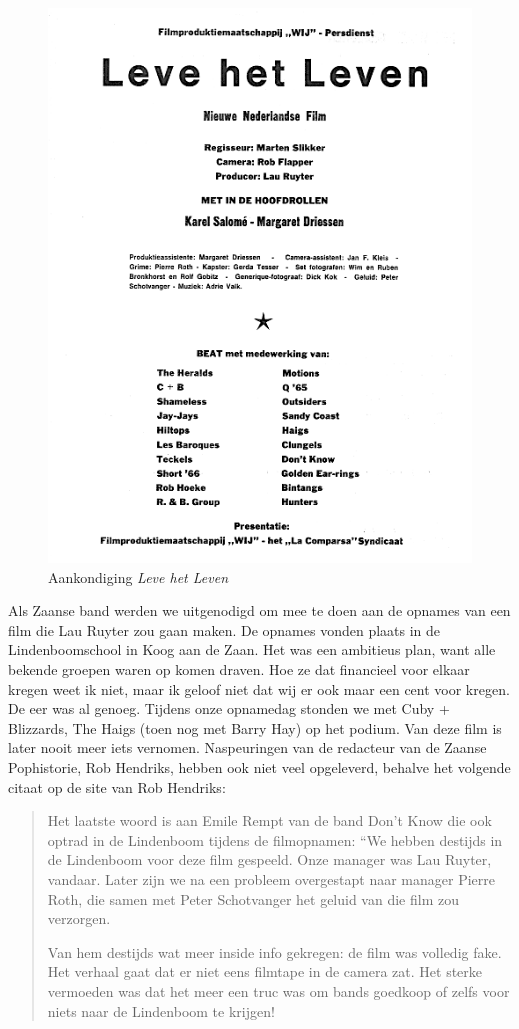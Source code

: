 \documentclass[10pt,twoside, openright]{memoir}
\begin{document}
\begin{figure}
\includegraphics[width=\textwidth]{img/ch30/film}
\caption*{\footnotesize Aankondiging \emph{Leve het Leven}}
\end{figure}

Als Zaanse band werden we uitgenodigd om mee te doen aan de opnames van een film die Lau Ruyter zou gaan maken. De opnames vonden plaats in de Lindenboomschool in Koog aan de Zaan. Het was een ambitieus plan, want alle bekende groepen waren op komen draven. Hoe ze dat financieel voor elkaar kregen weet ik niet, maar ik geloof niet dat wij er ook maar een cent voor kregen. De eer was al genoeg. Tijdens onze opnamedag stonden we met Cuby + Blizzards, The Haigs (toen nog met Barry Hay) op het podium. Van deze film is later nooit meer iets vernomen. Naspeuringen van de redacteur van de Zaanse Pophistorie, Rob Hendriks, hebben ook niet veel opgeleverd, behalve het volgende citaat op de site van Rob Hendriks: 

\begin{quote}
Het laatste woord is aan Emile Rempt van de band Don’t Know die ook optrad in de Lindenboom tijdens de filmopnamen: “We hebben destijds in de Lindenboom voor deze film gespeeld. Onze manager was Lau Ruyter, vandaar. Later zijn we na een probleem overgestapt naar manager Pierre Roth, die samen met Peter Schotvanger het geluid van die film zou verzorgen.

Van hem destijds wat meer inside info gekregen: de film was volledig fake. Het verhaal gaat dat er niet eens filmtape in de camera zat. Het sterke vermoeden was dat het meer een truc was om bands goedkoop of zelfs voor niets naar de Lindenboom te krijgen!
\end{quote}
\end{document}
